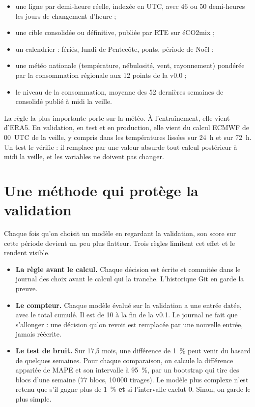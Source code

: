 \documentclass[11pt,a4paper]{article}
\begin{document}
\begin{itemize}
  \item une ligne par demi-heure réelle, indexée en UTC, avec 46 ou 50 demi-heures les jours de changement d'heure ;
  \item une cible consolidée ou définitive, publiée par RTE sur éCO2mix ;
  \item un calendrier : fériés, lundi de Pentecôte, ponts, période de Noël ;
  \item une météo nationale (température, nébulosité, vent, rayonnement) pondérée par la consommation régionale aux 12 points de la v0.0 ;
  \item le niveau de la consommation, moyenne des 52 dernières semaines de consolidé publié à midi la veille.
\end{itemize}

La règle la plus importante porte sur la météo. À l'entraînement, elle vient d'ERA5. En validation, en test et en production, elle vient du calcul ECMWF de 00~UTC de la veille, y compris dans les températures lissées sur 24~h et sur 72~h. Un test le vérifie : il remplace par une valeur absurde tout calcul postérieur à midi la veille, et les variables ne doivent pas changer.

\section{Une méthode qui protège la validation}

Chaque fois qu'on choisit un modèle en regardant la validation, son score sur cette période devient un peu plus flatteur. Trois règles limitent cet effet et le rendent visible.

\begin{itemize}
  \item \textbf{La règle avant le calcul.} Chaque décision est écrite et commitée dans le journal des choix avant le calcul qui la tranche. L'historique Git en garde la preuve.
  \item \textbf{Le compteur.} Chaque modèle évalué sur la validation a une entrée datée, avec le total cumulé. Il est de 10 à la fin de la v0.1. Le journal ne fait que s'allonger : une décision qu'on revoit est remplacée par une nouvelle entrée, jamais réécrite.
  \item \textbf{Le test de bruit.} Sur 17,5 mois, une différence de 1~\% peut venir du hasard de quelques semaines. Pour chaque comparaison, on calcule la différence appariée de MAPE et son intervalle à 95~\%, par un bootstrap qui tire des blocs d'une semaine (77 blocs, 10\,000 tirages). Le modèle plus complexe n'est retenu que s'il gagne plus de 1~\% \textbf{et} si l'intervalle exclut 0. Sinon, on garde le plus simple.
\end{itemize}
\end{document}
